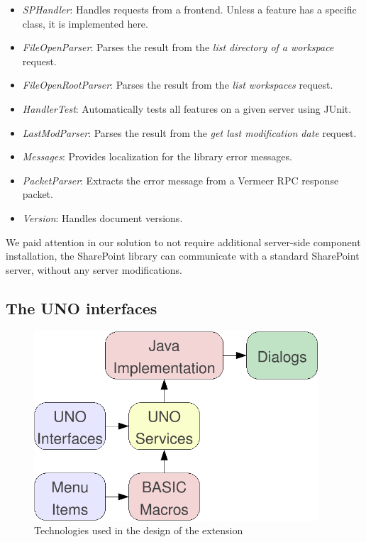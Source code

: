 \begin{itemize}
\item \emph{SPHandler}: Handles requests from a frontend. Unless a feature has a
specific class, it is implemented here.
\item \emph{FileOpenParser}: Parses the result from the \emph{list directory of
a workspace} request.
\item \emph{FileOpenRootParser}: Parses the result from the \emph{list
workspaces} request.
\item \emph{HandlerTest}: Automatically tests all features on a given server
using JUnit.
\item \emph{LastModParser}: Parses the result from the \emph{get last
modification date} request.
\item \emph{Messages}: Provides localization for the library error messages.
\item \emph{PacketParser}: Extracts the error message from a Vermeer
RPC \cite{vermeer} response packet.
\item \emph{Version}: Handles document versions.
\end{itemize}

We paid attention in our solution to not require additional server-side component
installation, the SharePoint library can communicate with a standard SharePoint
server, without any server modifications.

\subsection{The UNO interfaces}

\begin{figure}[H]
\centering
\includegraphics[width=400px,keepaspectratio]{design-technologies.pdf}
\caption{Technologies used in the design of the extension}
\label{fig:design-technologies}
\end{figure}

